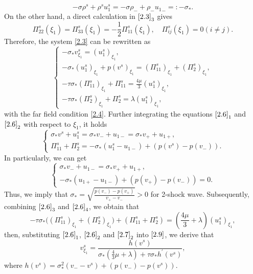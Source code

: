 \documentclass[10pt,reqno]{amsart}
\numberwithin{equation}{section}
\begin{document}
\begin{equation}\label{2.5}
-\sigma\rho^s+\rho^s u_1^s=-\sigma\rho_-+\rho_- {u_1}_-=:-\sigma_{\ast}.
\end{equation}
On the other hand, a direct calculation in $\eqref{2.3}_3$ gives
\begin{equation}\label{2.4}
\Pi_{22}^s(\xi_1)=\Pi_{33}^s(\xi_1)=-\frac{1}{2}\Pi^s_{11}(\xi_1),\quad \Pi^s_{ij}(\xi_1)=0 (i\neq j).
\end{equation}
Therefore, the system \eqref{2.3} can be rewritten as
\begin{equation}\label{2.6}
\begin{cases}
-\sigma_{\ast}v^s_{\xi_1}=(u_1^s)_{\xi_1},\\
-\sigma_{\ast}( u_1^s)_{\xi_1}+p(v^s)_{\xi_1}=
                            (\Pi_{11}^s)_{\xi_1}+(\Pi_2^s)_{\xi_1},\\
-\tau\sigma_{\ast} (\Pi^s_{11})_{\xi_1}+\Pi^s_{11}=\frac{4\mu}{3}(u_1^s)_{\xi_1},\\
-\tau\sigma_{\ast} (\Pi_2^s)_{\xi_1}+\Pi^s_2=\lambda(u_1^s)_{\xi_1},
\end{cases}
\end{equation}
with the far field condition \eqref{2.4}. Further integrating the equations $\eqref{2.6}_1$ and $\eqref{2.6}_2$ with respect to $\xi_1$, it holds
\begin{equation}\label{2.7}
\begin{cases}
\sigma_\ast v^s+u_1^s=\sigma_\ast v_-+u_{1-}=\sigma_\ast v_++u_{1+},\\
\Pi^s_{11}+\Pi^s_2=-\sigma_\ast(u_1^s-u_{1-})+(p(v^s)-p(v_-)).
\end{cases}
\end{equation}
In particularly, we can get
\begin{equation}\label{2.8}
\begin{cases}
\sigma_\ast v_-+u_{1-}=\sigma_\ast v_++u_{1+},\\
-\sigma_\ast(u_{1+}-u_{1-})+(p(v_+)-p(v_-))=0.
\end{cases}
\end{equation}
Thus, we imply that $\sigma_\ast=\sqrt{\frac{p(v_-)-p(v_+)}{v_+-v_-}}>0$ for 2-shock wave.
Subsequently, combining $\eqref{2.6}_3$ and $\eqref{2.6}_4$, we obtain that
\begin{equation}\label{2.9}
-\tau\sigma_\ast\Big((\Pi^s_{11})_{\xi_1}+(\Pi^s_2)_{\xi_1}\Big)+(\Pi^s_{11}+\Pi^s_2)
=(\frac{4\mu}{3}+\lambda)(u_1^s)_{\xi_1},
\end{equation}
then, substituting $\eqref{2.6}_1$, $\eqref{2.6}_2$ and $\eqref{2.7}_2$ into $\eqref{2.9}$, we derive that
\begin{equation}\label{2.10}
v^s_{\xi_1}=\frac{h(v^s)}{\sigma_\ast(\frac{4}{3}\mu+\lambda)+\tau\sigma_\ast h^{\prime}(v^s)},
\end{equation}
where $h(v^s)=\sigma_\ast^2(v_--v^s)+(p(v_-)-p(v^s))$.
\end{document}

